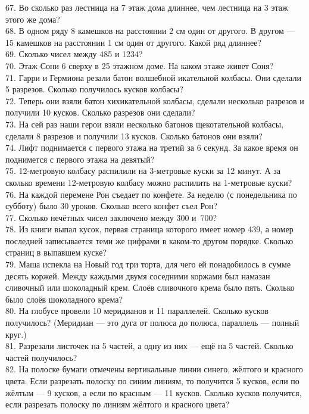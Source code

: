 \documentclass[12pt]{article}
\begin{document}
67. Во сколько раз лестница на 7 этаж дома длиннее, чем лестница на 3 этаж этого же дома?\\
68. В одном ряду 8 камешков на расстоянии 2 см один от другого. В другом --- 15 камешков на расстоянии 1 см один от другого. Какой ряд длиннее?\\
69. Сколько чисел между 485 и  1234?\\
70. Этаж Сони 6 сверху в 25 этажном доме. На каком этаже живет Соня?\\
71. Гарри и Гермиона резали батон волшебной икательной колбасы. Они сделали 5 разрезов. Сколько получилось кусков колбасы?\\
72. Теперь они взяли батон хихикательной колбасы, сделали несколько разрезов и получили 10 кусков. Сколько разрезов они сделали?\\
73. На сей раз наши герои взяли несколько батонов щекотательной колбасы, сделали 8 разрезов и получили 13 кусков. Сколько батонов они взяли?\\
74. Лифт поднимается с первого этажа на третий за 6 секунд. За какое время он поднимется с первого этажа на девятый?\\
75. 12-метровую колбасу распилили на 3-метровые куски за 12 минут. А за сколько времени 12-метровую колбасу можно распилить на 1-метровые куски?\\
76. На каждой перемене Рон съедает по конфете. За неделю (с понедельника по субботу) было 30 уроков. Сколько всего конфет съел Рон?\\
77. Сколько нечётных чисел заключено между 300 и 700?\\
78. Из книги выпал кусок, первая страница которого имеет номер 439, а номер последней записывается теми же цифрами в каком-то другом порядке. Сколько страниц в выпавшем куске?\\
79. Маша испекла на Новый год три торта, для чего ей понадобилось в сумме десять коржей. Между каждыми двумя соседними коржами был намазан сливочный или шоколадный крем. Слоёв сливочного крема было пять. Сколько было слоёв шоколадного крема?\\
80. На глобусе провели 10 меридианов и 11 параллелей. Сколько кусков получилось? (Меридиан --- это дуга от полюса до полюса, параллель --– полный круг.)\\
81. Разрезали листочек на 5 частей, а одну из них --- ещё на 5 частей. Сколько частей получилось?\\
82. На полоске бумаги отмечены вертикальные линии синего, жёлтого и красного цвета. Если разрезать полоску по синим линиям, то получится 5 кусков, если по жёлтым --- 9 кусков, а если по красным --- 11 кусков. Сколько кусков получится, если разрезать полоску по линиям жёлтого и красного цвета?\\
\end{document}
